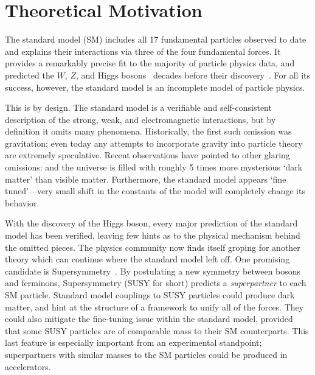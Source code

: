 \chapter{Theoretical Motivation}

The standard model (SM) includes all 17 fundamental particles observed to date and explains their interactions via three of the four fundamental forces.
It provides a remarkably precise fit to the majority of particle physics data, and predicted the $W$, $Z$, and Higgs bosons~\cite{wzmass1,higgs1,higgs2} decades before their discovery~\cite{ua1w,ua2w,ua1z,ua2z,atlashiggs,cmshiggs}.
For all its success, however, the standard model is an incomplete model of particle physics.

This is by design. The standard model is a verifiable and self-consistent description of the strong, weak, and electromagnetic interactions, but by definition it omits many phenomena.
Historically, the first such omission was gravitation; even today any attempts to incorporate gravity into particle theory are extremely speculative.
Recent observations have pointed to other glaring omissions:
and the universe is filled with roughly 5 times more mysterious `dark matter' than visible matter.
Furthermore, the standard model appears `fine tuned'---very small shift in the constants of the model will completely change its behavior.

With the discovery of the Higgs boson, every major prediction of the standard model has been verified, leaving few hints as to the physical mechanism behind the omitted pieces.
The physics community now finds itself groping for another theory which can continue where the standard model left off. One promising candidate is Supersymmetry~\cite{susyprimer,srednicki,pdg2014}.
By postulating a new symmetry between bosons and ferminons, Supersymmetry (SUSY for short) predicts a \emph{superpartner} to each SM particle. Standard model couplings to SUSY particles could produce dark matter,
and hint at the structure of a framework to unify all of the forces.
They could also mitigate the fine-tuning issue within the standard model, provided that some SUSY particles are of comparable mass to their SM counterparts. This last feature is especially important from an experimental standpoint; superpartners with similar masses to the SM particles could be produced in accelerators.

